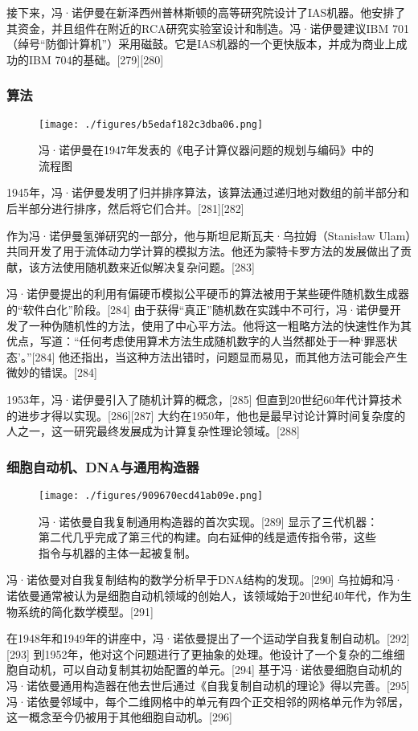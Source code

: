 接下来，冯·诺伊曼在新泽西州普林斯顿的高等研究院设计了IAS机器。他安排了其资金，并且组件在附近的RCA研究实验室设计和制造。冯·诺伊曼建议IBM 701（绰号“防御计算机”）采用磁鼓。它是IAS机器的一个更快版本，并成为商业上成功的IBM 704的基础。[279][280]
\subsubsection{算法}
\begin{figure}[ht]
\centering
\texttt{[image: ./figures/b5edaf182c3dba06.png]}
\caption{冯·诺伊曼在1947年发表的《电子计算仪器问题的规划与编码》中的流程图} \label{fig_Neuman_8}
\end{figure}
1945年，冯·诺伊曼发明了归并排序算法，该算法通过递归地对数组的前半部分和后半部分进行排序，然后将它们合并。[281][282]

作为冯·诺伊曼氢弹研究的一部分，他与斯坦尼斯瓦夫·乌拉姆（Stanisław Ulam）共同开发了用于流体动力学计算的模拟方法。他还为蒙特卡罗方法的发展做出了贡献，该方法使用随机数来近似解决复杂问题。[283]

冯·诺伊曼提出的利用有偏硬币模拟公平硬币的算法被用于某些硬件随机数生成器的“软件白化”阶段。[284] 由于获得“真正”随机数在实践中不可行，冯·诺伊曼开发了一种伪随机性的方法，使用了中心平方法。他将这一粗略方法的快速性作为其优点，写道：“任何考虑使用算术方法生成随机数字的人当然都处于一种‘罪恶状态’。”[284] 他还指出，当这种方法出错时，问题显而易见，而其他方法可能会产生微妙的错误。[284]

1953年，冯·诺伊曼引入了随机计算的概念，[285] 但直到20世纪60年代计算技术的进步才得以实现。[286][287] 大约在1950年，他也是最早讨论计算时间复杂度的人之一，这一研究最终发展成为计算复杂性理论领域。[288]
\subsubsection{细胞自动机、DNA与通用构造器}
\begin{figure}[ht]
\centering
\texttt{[image: ./figures/909670ecd41ab09e.png]}
\caption{冯·诺依曼自我复制通用构造器的首次实现。[289] 显示了三代机器：第二代几乎完成了第三代的构建。向右延伸的线是遗传指令带，这些指令与机器的主体一起被复制。} \label{fig_Neuman_9}
\end{figure}
冯·诺依曼对自我复制结构的数学分析早于DNA结构的发现。[290] 乌拉姆和冯·诺依曼通常被认为是细胞自动机领域的创始人，该领域始于20世纪40年代，作为生物系统的简化数学模型。[291]

在1948年和1949年的讲座中，冯·诺依曼提出了一个运动学自我复制自动机。[292][293] 到1952年，他对这个问题进行了更抽象的处理。他设计了一个复杂的二维细胞自动机，可以自动复制其初始配置的单元。[294] 基于冯·诺依曼细胞自动机的冯·诺依曼通用构造器在他去世后通过《自我复制自动机的理论》得以完善。[295] 冯·诺依曼邻域中，每个二维网格中的单元有四个正交相邻的网格单元作为邻居，这一概念至今仍被用于其他细胞自动机。[296]
